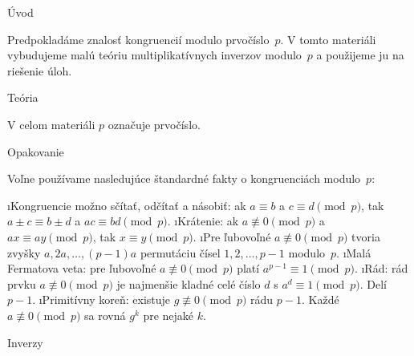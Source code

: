 





\sec Úvod

Predpokladáme znalosť kongruencií modulo prvočíslo~$p$. V tomto materiáli vybudujeme malú teóriu multiplikatívnych inverzov modulo~$p$ a použijeme ju na riešenie úloh.

\sec Teória

V celom materiáli $p$ označuje prvočíslo.

\secc Opakovanie

Voľne používame nasledujúce štandardné fakty o kongruenciách modulo~$p$:

\begitems
\i Kongruencie možno sčítať, odčítať a násobiť: ak $a \equiv b$ a $c \equiv d \pmod{p}$, tak $a \pm c \equiv b \pm d$ a $ac \equiv bd \pmod{p}$.
\i Krátenie: ak $a \not\equiv 0 \pmod{p}$ a $ax \equiv ay \pmod{p}$, tak $x \equiv y \pmod{p}$.
\i Pre ľubovoľné $a \not\equiv 0 \pmod{p}$ tvoria zvyšky $a, 2a, \ldots, (p-1)a$ permutáciu čísel $1, 2, \ldots, p-1$ modulo~$p$.
\i Malá Fermatova veta: pre ľubovoľné $a \not\equiv 0 \pmod{p}$ platí $a^{p-1} \equiv 1 \pmod{p}$.
\i Rád: rád prvku $a \not\equiv 0 \pmod{p}$ je najmenšie kladné celé číslo $d$ s $a^d \equiv 1 \pmod{p}$. Delí $p - 1$.
\i Primitívny koreň: existuje $g \not\equiv 0 \pmod{p}$ rádu $p - 1$. Každé $a \not\equiv 0 \pmod{p}$ sa rovná $g^k$ pre nejaké $k$.
\enditems

\secc Inverzy


